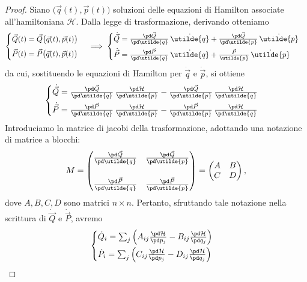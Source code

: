 \begin{proof}
	Siano \(\big(\vec{q}(t),\vec{p}(t)\big)\) soluzioni delle equazioni di Hamilton associate all'hamiltoniana \(\mathcal{H}\). Dalla legge di trasformazione, derivando otteniamo
	\[
		\begin{cases}
			\vec{Q}(t) = \vec{Q}\big(\vec{q}(t),\vec{p}(t)\big) \\[0.5em]
			\vec{P}(t) = \vec{P}\big(\vec{q}(t),\vec{p}(t)\big)
		\end{cases} \implies
		\begin{cases}
			\dot{\vec{Q}} = \frac{\pd\vec{Q}}{\pd\utilde{q}} \, \dot{\utilde{q}} + \frac{\pd\vec{Q}}{\pd\utilde{p}}\,\dot{\utilde{p}} \\[0.5em]
			\dot{\vec{P}} = \frac{\pd\vec{P}}{\pd\utilde{q}}\,\dot{\utilde{q}} + \frac{\vec{P}}{\utilde{p}}\,\dot{\utilde{p}}
		\end{cases}
	\]
	da cui, sostituendo le equazioni di Hamilton per \(\dot{\vec{q}}\) e \(\dot{\vec{p}}\), si ottiene
	\[
		\begin{cases}
			\dot{\vec{Q}} = \frac{\pd\vec{Q}}{\pd\utilde{q}} \, \frac{\pd\mathcal{H}}{\pd\utilde{p}} - \frac{\pd\vec{Q}}{\pd\utilde{p}}\,\frac{\pd\mathcal{H}}{\pd\utilde{q}} \\[0.5em]
			\dot{\vec{P}} = \frac{\pd\vec{P}}{\pd\utilde{q}} \, \frac{\pd\mathcal{H}}{\pd\utilde{p}} - \frac{\pd\vec{P}}{\pd\utilde{p}} \, \frac{\pd\mathcal{H}}{\pd\utilde{q}}
		\end{cases}
	\]
	Introduciamo la matrice di jacobi della trasformazione, adottando una notazione di matrice a blocchi:
	\[
		M = \begin{pmatrix}
			\frac{\pd\vec{Q}}{\pd\utilde{q}} & \frac{\pd\vec{Q}}{\pd\utilde{p}} \\[0.5em]\\
			\frac{\pd\vec{P}}{\pd\utilde{q}} & \frac{\pd\vec{P}}{\pd\utilde{p}}
		\end{pmatrix} = 
		\begin{pmatrix}
			A & B  \\
			C & D
		\end{pmatrix},
	\]
	dove \(A,B,C,D\) sono matrici \(n \times n\). Pertanto, sfruttando tale notazione nella scrittura di \(\dot{\vec{Q}}\) e \(\dot{\vec{P}}\), avremo
	\[
		\begin{cases}
			\dot{Q}_i = \sum_j \left(A_{ij} \frac{\pd\mathcal{H}}{\pd p_j} - B_{ij} \frac{\pd\mathcal{H}}{\pd q_j}\right) \\[0.5em]
			\dot{P}_i = \sum_j \left(C_{ij} \frac{\pd\mathcal{H}}{\pd p_j} - D_{ij} \frac{\pd\mathcal{H}}{\pd q_j}\right)

\end{cases}\]
\end{proof}
